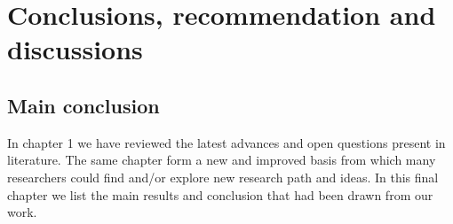 \chapter{Conclusions, recommendation and discussions}



\section{Main conclusion}

In chapter 1 we have reviewed the latest advances and open questions present in literature. The same chapter form a new and improved basis from which
 many researchers could find and/or explore new research path and ideas. In this final chapter we list the main results and conclusion that had been drawn 
 from our work.

